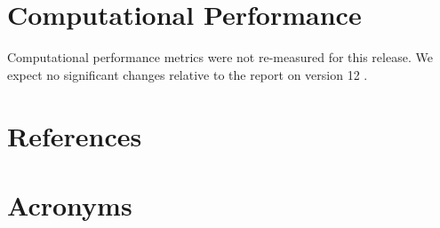 \documentclass[DM,lsstdraft,toc]{lsstdoc}
\begin{document}
\section{Computational Performance}\label{computational-performance}

Computational performance metrics were not re-measured for this release.
We expect no significant changes relative to the
report on version 12 .

\appendix

\section{References} \label{sec:bib}
\renewcommand{\refname}{} %


\section{Acronyms} \label{sec:acronyms}

\end{document}
